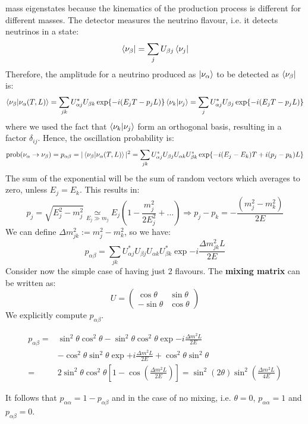 \documentclass[10.75pt,a4paper,openright,bottom=2cm]{article}
\newcommand{\beginbox}[1]{\begin{tcolorbox}[width=\textwidth,colback={black!40},title={#1},colbacktitle={purple!55},coltitle=black]}
\renewcommand{\endbox}{\end{tcolorbox}\noindent}
\begin{document}
mass eigenstates because the kinematics of the production process is different for different
masses. The detector measures the neutrino flavour, i.e. it detects neutrinos in a state:
\[
\bra{\nu_\beta}=\sum_jU_{\beta j}\bra{\nu_j}
\]
Therefore, the amplitude for a neutrino produced as $\ket{\nu_\alpha}$ to be detected as $\bra{\nu_\beta}$ is:
\[
\braket{\nu_\beta}{\nu_\alpha(T,L)}=\sum_{jk}U_{\alpha j}^*U_{\beta k}\exp{-i(E_jT-p_jL)}\braket{\nu_k}{\nu_j}=\sum_jU_{\alpha j}^*U_{\beta j}\exp{-i(E_jT-p_jL)}
\]
where we used the fact that $\braket{\nu_k}{\nu_j}$ form an orthogonal basis, resulting in a factor $\delta_{ij}$. Hence, the oscillation probability is:
\[
\text{prob}(\nu_\alpha\to\nu_\beta)=p_{\alpha\beta}=|\braket{\nu_\beta}{\nu_\alpha(T,L)}|^2=\sum_{jk}U_{\alpha j}^*U_{\beta j}U_{\alpha k}U_{\beta k}^*\exp{-i(E_j-E_k)T+i(p_j-p_k)L}
\]
The sum of the exponential will be the sum of random vectors which averages to zero, unless $E_j=E_k$. This results in:
\[
p_j=\sqrt{E_j^2-m_j^2}\underset{E_j\gg m_j}{\simeq}E_j\left(1-\frac{m_j^2}{2E_j^2}+\dots\right)\Rightarrow p_j-p_k=-\frac{(m_j^2-m_k^2)}{2E}
\]
We can define $\Delta m_{jk}^2:=m_j^2-m_k^2$, so we have:
\[
p_{\alpha\beta}=\sum_{jk}U_{\alpha j}^*U_{\beta j}U_{\alpha k}U_{\beta k}^*\exp{-i\frac{\Delta m_{jk}^2L}{2E}}
\]
Consider now the simple case of having just 2 flavours. The \textbf{mixing matrix} can be written as:
\[
U=\left(\begin{array}{cc}
    \cos\theta & \sin\theta \\
    -\sin\theta & \cos\theta
\end{array}\right)
\]
We explicitly compute $p_{\alpha\beta}$.
\beginbox{Oscillation Probability in the Vacuum}
\begin{align*}
p_{\alpha\beta}=&\sin^2\theta\cos^2\theta-\sin^2\theta\cos^2\theta\exp{-i\frac{\Delta m^2L}{2E}}\\
&-\cos^2\theta\sin^2\theta\exp{+i\frac{\Delta m^2L}{2E}}+\cos^2\theta\sin^2\theta\\
=&2\sin^2\theta\cos^2\theta\left[1-\cos\left(\frac{\Delta m^2L}{2E}\right)\right]=\sin^2(2\theta)\sin^2\left(\frac{\Delta m^2L}{4E}\right)
\end{align*}
\endbox
It follows that $p_{\alpha\alpha}=1-p_{\alpha\beta}$ and in the case of no mixing, i.e. $\theta=0$, $p_{\alpha\alpha}=1$ and $p_{\alpha\beta}=0$.
\end{document}
